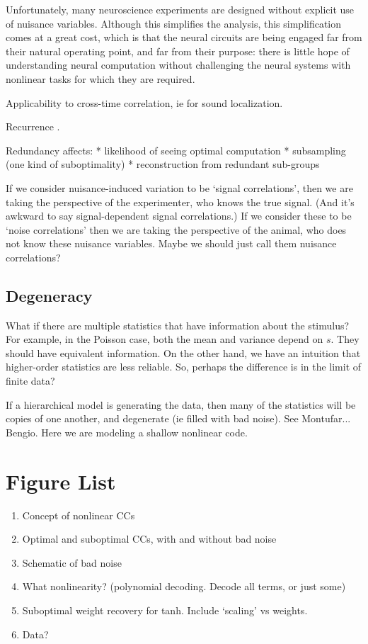 \documentclass[11pt,twocolumn]{article}
\begin{document}
Unfortunately, many neuroscience experiments are designed without explicit use of nuisance variables. Although this simplifies the analysis, this simplification comes at a great cost, which is that the neural circuits are being engaged far from their natural operating point, and far from their purpose: there is little hope of understanding neural computation without challenging the neural systems with nonlinear tasks for which they are required.

Applicability to cross-time correlation, ie for sound localization.

Recurrence \cite{Wimmer2015}.

Redundancy affects:
* likelihood of seeing optimal computation
* subsampling (one kind of suboptimality)
* reconstruction from redundant sub-groups

If we consider nuisance-induced variation to be `signal correlations', then we are taking the perspective of the experimenter, who knows the true signal. (And it's awkward to say signal-dependent signal correlations.) If we consider these to be `noise correlations' then we are taking the perspective of the animal, who does not know these nuisance variables. Maybe we should just call them nuisance correlations?

\subsection{Degeneracy}

What if there are multiple statistics that have information about the stimulus? For example, in the Poisson case, both the mean and variance depend on $s$. They should have equivalent information. On the other hand, we have an intuition that higher-order statistics are less reliable. So, perhaps the difference is in the limit of finite data?

If a hierarchical model is generating the data, then many of the statistics will be copies of one another, and degenerate (ie filled with bad noise). See Montufar... Bengio. Here we are modeling a shallow nonlinear code.


\section{Figure List}
\begin{enumerate}
\item Concept of nonlinear CCs
\item Optimal and suboptimal CCs, with and without bad noise
\item Schematic of bad noise
\item What nonlinearity? (polynomial decoding. Decode all terms, or just some)
\item Suboptimal weight recovery for tanh. Include `scaling' vs weights.
\item Data?
\end{enumerate}




\end{document}
